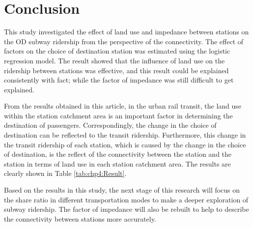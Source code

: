 %
\section{Conclusion}
%
This study investigated the effect of land use and impedance between stations on the OD subway ridership from the perspective of the connectivity. The effect of factors on the choice of destination station was estimated using the logistic regression model. The result showed that the influence of land use on the ridership between stations was effective, and this result could be explained consistently with fact; while the factor of impedance was still difficult to get explained.

%
From the results obtained in this article, in the urban rail transit, the land use within the station catchment area is an important factor in determining the destination of passengers. Correspondingly, the change in the choice of destination can be reflected to the transit ridership. Furthermore, this change in the transit ridership of each station, which is caused by the change in the choice of destination, is the reflect of the connectivity between the station and the station in terms of land use in each station catchment area. The results are clearly shown in Table \ref{tab:chp4:Result}.

%
Based on the results in this study, the next stage of this research will focus on the share ratio in different transportation modes to make a deeper exploration of subway ridership. The factor of impedance will also be rebuilt to help to describe the connectivity between stations more accurately.

\clearpage %
% 

